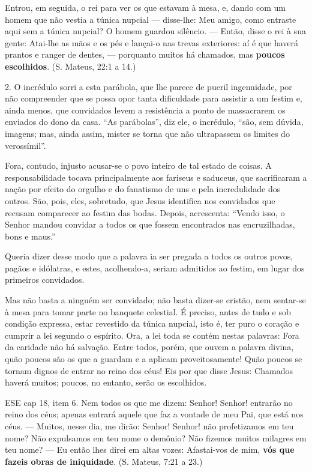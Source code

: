 \documentclass{rbfin}
\begin{document}
\begin{multicols}{2}
Entrou, em seguida, o rei para ver os que estavam à mesa, e, dando com um homem que não vestia a túnica nupcial — disse-lhe: Meu amigo, como entraste aqui sem a túnica nupcial? O homem guardou silêncio. — Então, disse o rei à sua gente: Atai-lhe as mãos e os pés e lançai-o nas trevas exteriores: aí é que haverá prantos e ranger de dentes, — porquanto muitos há chamados, mas \textbf{poucos escolhidos}. (S. Mateus, 22:1 a 14.)

2. O incrédulo sorri a esta parábola, que lhe parece de pueril ingenuidade, por não compreender que se possa opor tanta dificuldade para assistir a um festim e, ainda menos, que convidados levem a resistência a ponto de massacrarem os enviados do dono da casa. “As parábolas”, diz ele, o incrédulo, “são, sem dúvida, imagens; mas, ainda assim, mister se torna que não ultrapassem os limites do verossímil”.

Fora, contudo, injusto acusar-se o povo inteiro de tal estado de coisas. A responsabilidade tocava principalmente aos fariseus e saduceus, que sacrificaram a nação por efeito do orgulho e do fanatismo de uns e pela incredulidade dos outros. São, pois, eles, sobretudo, que Jesus identifica nos convidados que recusam comparecer ao festim das bodas. Depois, acrescenta: “Vendo isso, o Senhor mandou convidar a todos os que fossem encontrados nas encruzilhadas, bons e maus.” 

\newpage

Queria dizer desse modo que a palavra ia ser pregada a todos os outros povos, pagãos e idólatras, e estes, acolhendo-a, seriam admitidos ao festim, em lugar dos primeiros convidados.

Mas não basta a ninguém ser convidado; não basta dizer-se cristão, nem sentar-se à mesa para tomar parte no banquete celestial. É preciso, antes de tudo e sob condição expressa, estar revestido da túnica nupcial, isto é, ter puro o coração e cumprir a lei segundo o espírito. Ora, a lei toda se contém nestas palavras: Fora da caridade não há salvação. Entre todos, porém, que ouvem a palavra divina, quão poucos são os que a guardam e a aplicam proveitosamente! Quão poucos se tornam dignos de entrar no reino dos céus! Eis por que disse Jesus: Chamados haverá muitos; poucos, no entanto, serão os escolhidos.

\dotfill

ESE cap 18, item 6. Nem todos os que me dizem: Senhor! Senhor! entrarão no reino dos céus; apenas entrará aquele que faz a vontade de meu Pai, que está nos céus. — Muitos, nesse dia, me dirão: Senhor! Senhor! não profetizamos em teu nome? Não expulsamos em teu nome o demônio? Não fizemos muitos milagres em teu nome? — Eu então lhes direi em altas vozes: Afastai-vos de mim, \textbf{vós que fazeis obras de iniquidade}. (S. Mateus, 7:21 a 23.)


\end{multicols}
\end{document}
